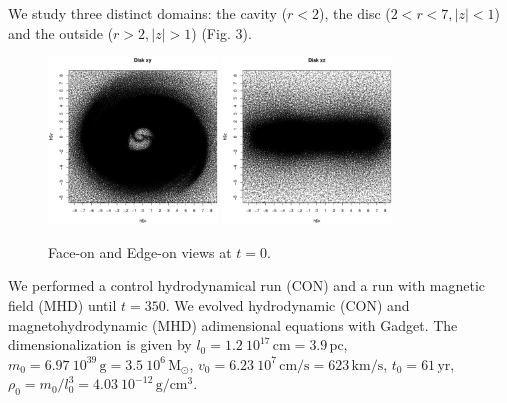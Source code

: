 \documentclass[a4paper,12pt]{article}
\begin{document}
We study three distinct domains: the cavity ($r<2$), the disc ($2<r<7, \lvert z \rvert <1$) and the outside ($r>2, \lvert z \rvert >1$) (Fig. 3).
\begin{figure}[!ht]
 \begin{center}
  \includegraphics[width=0.4\textwidth]{figs/disk_xy.eps}
  \includegraphics[width=0.4\textwidth]{figs/disk_xz.eps}
  \caption{Face-on and Edge-on views at $t=0$.}
 \end{center}
\end{figure}

We performed a control hydrodynamical run (CON) and a run with magnetic field (MHD) until $t=350$. 
We evolved hydrodynamic (CON) and magnetohydrodynamic (MHD) adimensional equations with Gadget.
The dimensionalization is given by $l_0 = 1.2\ 10^{17}\,\text{cm}=3.9\,\text{pc}$, $m_0=6.97 \ 10^{39}\,\text{g}=3.5\ 10^6\,\text{M}_{\odot}$, 
$v_0=6.23\ 10^7\,\text{cm/s}=623\,\text{km/s}$, $t_0=61\,\text{yr}$, $\rho_0=m_0/l_0^3=4.03\ 10^{-12}\,\text{g}/\text{cm}^3$.
\end{document}
